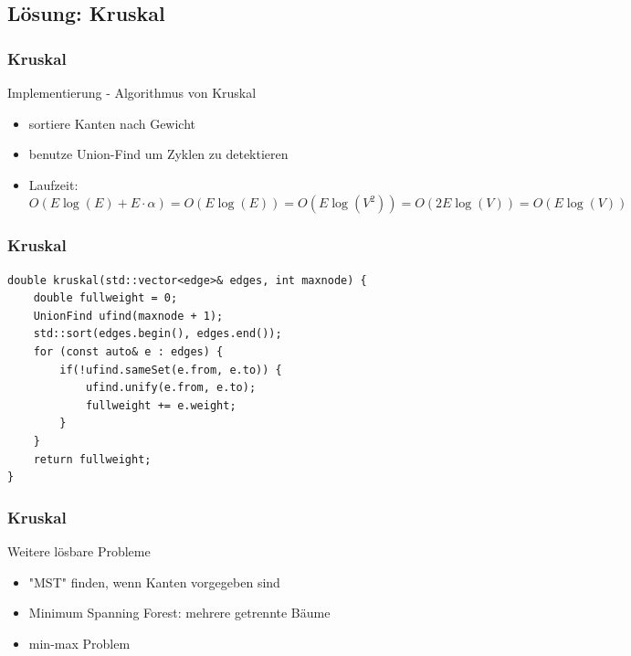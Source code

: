 \subsection{Lösung: Kruskal}

\begin{frame}
\frametitle{Kruskal}
\begin{block}{Implementierung - Algorithmus von Kruskal}
\begin{itemize}
\item sortiere Kanten nach Gewicht
\item benutze Union-Find um Zyklen zu detektieren
\item Laufzeit:\\
$O(E\log(E)+ E\cdot\alpha)=O(E\log(E))=O(E\log(V^2))=O(2E\log(V))=O(E\log(V))$
\end{itemize}
\end{block}
\end{frame}


\begin{frame}[fragile]
\frametitle{Kruskal}
\begin{lstlisting}[basicstyle=\footnotesize]
double kruskal(std::vector<edge>& edges, int maxnode) {
    double fullweight = 0;
    UnionFind ufind(maxnode + 1);
    std::sort(edges.begin(), edges.end());
    for (const auto& e : edges) {
        if(!ufind.sameSet(e.from, e.to)) {
            ufind.unify(e.from, e.to);
            fullweight += e.weight;
        }
    }
    return fullweight;
}
\end{lstlisting}
\end{frame}


\begin{frame}
\frametitle{Kruskal}
\begin{block}{Weitere lösbare Probleme}
\begin{itemize}
\item "MST" finden, wenn Kanten vorgegeben sind
\item Minimum Spanning Forest: mehrere getrennte Bäume
\item min-max Problem
\end{itemize}
\end{block}
\end{frame}